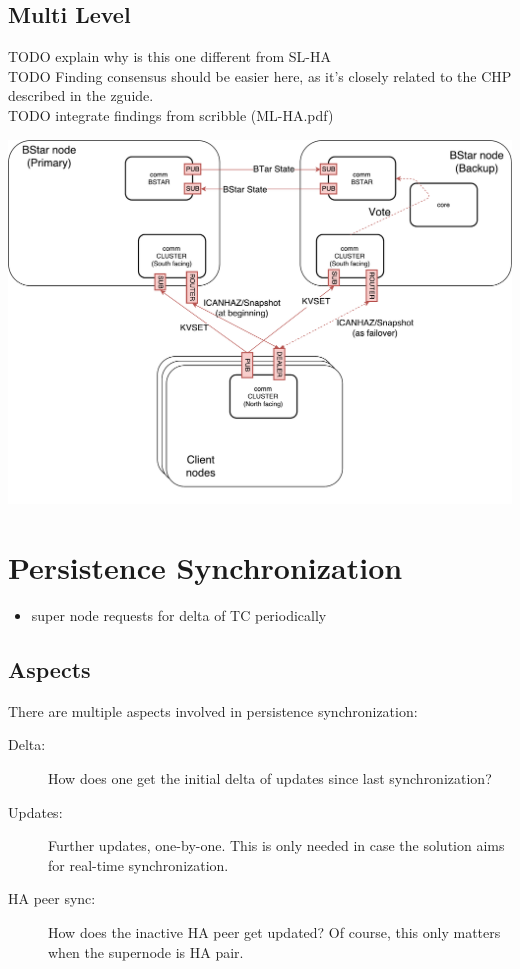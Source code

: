 \subsection{Multi Level}
TODO explain why is this one different from SL-HA\\
TODO Finding consensus should be easier here, as it's closely related to the CHP described in the zguide.\\
TODO integrate findings from scribble (ML-HA.pdf)

\includegraphics[width=\textwidth]{img/ML-HA_bstar.pdf}

\section{Persistence Synchronization}\label{sec:meth:psync}
\begin{itemize}
	\item super node requests for delta of TC periodically
\end{itemize}

\subsection{Aspects}

There are multiple aspects involved in persistence synchronization:

\begin{description}
	\item [Delta:]
		How does one get the initial delta of updates since last
		synchronization?

	\item [Updates:]
		Further updates, one-by-one. This is only needed in
		case the solution aims for real-time synchronization.

	\item [HA peer sync:]
		How does the inactive HA peer get updated? Of
		course, this only matters when the supernode is HA pair.
\end{description}

